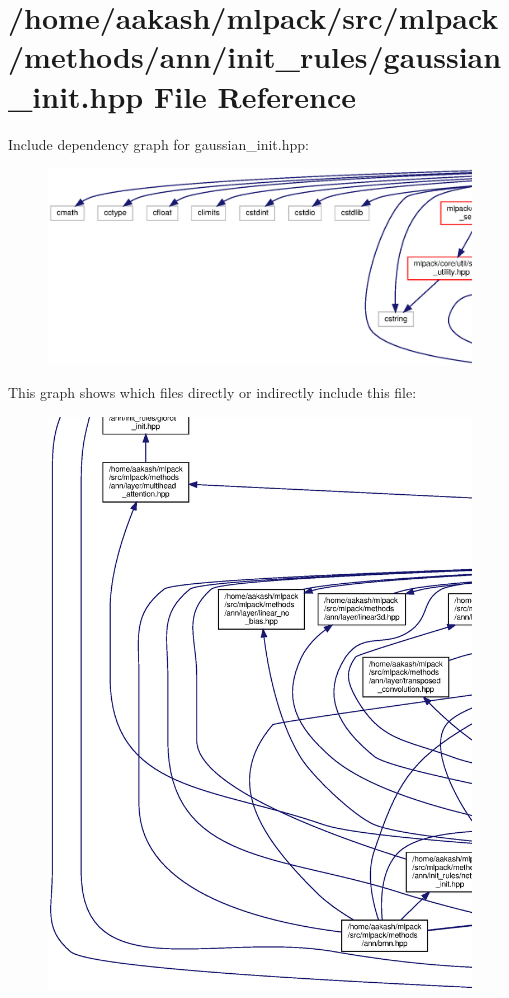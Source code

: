 \section{/home/aakash/mlpack/src/mlpack/methods/ann/init\+\_\+rules/gaussian\+\_\+init.hpp File Reference}
\label{gaussian__init_8hpp}
Include dependency graph for gaussian\+\_\+init.\+hpp\+:
\nopagebreak
\begin{figure}[H]
\begin{center}
\leavevmode
\includegraphics[width=350pt]{gaussian__init_8hpp__incl}
\end{center}
\end{figure}
This graph shows which files directly or indirectly include this file\+:
\nopagebreak
\begin{figure}[H]
\begin{center}
\leavevmode
\includegraphics[width=350pt]{gaussian__init_8hpp__dep__incl}
\end{center}
\end{figure}
